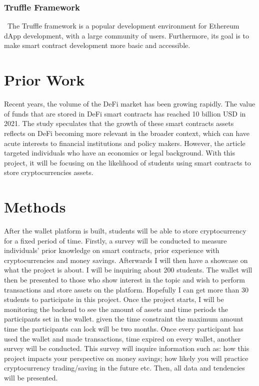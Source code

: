 \documentclass[10pt,twocolumn]{article}
\begin{document}
\subsubsection{Truffle Framework}\
The Truffle framework is a popular development environment for Ethereum dApp development, with a large community of users. Furthermore, its goal is to make smart contract development more basic and accessible.

\section{Prior Work}

Recent years, the volume of the DeFi market has been growing rapidly. The value of funds that are stored in DeFi smart contracts has reached 10 billion USD in 2021. The study speculates that the growth of these smart contracts assets reflects on DeFi becoming more relevant in the broader context, which can have acute interests to financial institutions and policy makers.\cite{Bartos} However, the article targeted individuals who have an economics or legal background. With this project, it will be focusing on the likelihood of students using smart contracts to store cryptocurrencies assets. 


\section{Methods}

After the wallet platform is built, students will be able to store cryptocurrency for a fixed period of time. Firstly, a survey will be conducted to measure individuals’ prior knowledge on smart contracts, prior experience with cryptocurrencies and money savings. Afterwards I will then have a showcase on what the project is about. I will be inquiring about 200 students. The wallet will then be presented to those who show interest in the topic and wish to perform transactions and store assets on the platform. Hopefully I can get more than 30 students to participate in this project.
	Once the project starts, I will be monitoring the backend to see the amount of assets and time periods the participants set in the wallet. given the time constraint the maximum amount time the participants can lock will be two months.
	Once every participant has used the wallet and made transactions, time expired on every wallet, another survey will be conducted. This survey will inquire information such as: how this project impacts your perspective on money savings; how likely you will practice cryptocurrency trading/saving in the future etc.
	Then, all data and tendencies will be presented.
\end{document}
